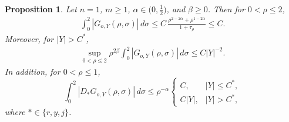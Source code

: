 \documentclass[12pt]{amsart}
\newtheorem{proposition}[theorem]{Proposition}
\begin{document}
\begin{proposition}\label{prop:Green:n=1}
Let $n=1$, $m\ge 1$, $\alpha\in \big(0,\frac{1}{2}\big)$, and $\beta\ge 0$. Then for $0<\rho\le 2$,
\begin{align}\label{eq:prop:Green:1}
    \int_0^2 |G_{o,Y}(\rho,\sigma)| \, d\sigma \le C\,\frac{\rho^{2-2\alpha} + \rho^{1-2\alpha}}{1+\tau_\rho}\le C.
\end{align}
Moreover, for $|Y|>C^*$,
\begin{align}\label{eq:prop:Green:2}
    \sup_{0<\rho\le 2} \rho^{2\beta}\int_0^2 |G_{o,Y}(\rho,\sigma)| \, d\sigma \le C|Y|^{-2}.
\end{align}
In addition, for $0<\rho\le 1$,
\begin{equation}\label{eq:prop:Green:3}
     \int_0^2 |D_* G_{o,Y}(\rho,\sigma)| \, d\sigma \le \rho^{-\alpha}\begin{cases}
         C, & |Y|\le C^*,\\[4pt]
         C|Y|, & |Y|>C^*,
     \end{cases}
\end{equation}
where $*\in\{r,y,j\}$.
\end{proposition}
\end{document}
